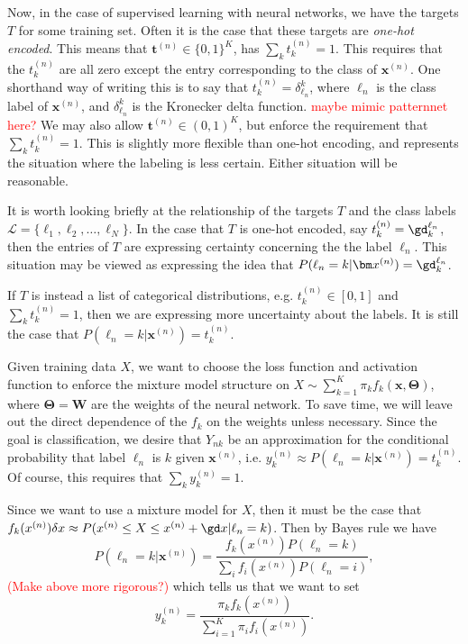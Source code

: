 Now, in the case of supervised learning with neural networks, we have the targets $T$ for
some training set.  Often it is the case that these targets are \textit{one-hot encoded}.
This means that $\bm t^{(n)}\in \{0,1\}^{K}$, has $\sum_k t_k^{(n)} = 1$.  This requires
that the $t_k^{(n)}$ are all zero except the entry corresponding to the class of $\bm
x^{(n)}$.  One shorthand way of writing this is to say that $t_k^{(n)}=\delta_{\ell_n}^k
$, where $\ell_n$ is the class label of $\bm x^{(n)}$, and $\delta_{\ell_n}^k$ is the 
Kronecker delta function. \textcolor{red}{maybe mimic patternnet here?}
We may also allow $\bm t^{(n)}\in (0,1)^{K}$, but enforce the requirement that $\sum_k
t_k^{(n)} = 1$.  This is slightly more flexible than one-hot encoding, and represents
the situation where the labeling is less certain.  Either situation will be reasonable.

It is worth looking briefly at the relationship of the targets $T$ and the class labels 
$\mathcal{L}=\{\ell_1, \ell_2,\ldots,\ell_N\}$.  In the case that $T$ is one-hot encoded,
say $t_k^{(n)}=\gd_k^{\ell_n}$, then the entries of $T$ are expressing certainty
concerning the the label $\ell_n$. This situation may be viewed as expressing the idea
that $P(\ell_n = k|\bm x^{(n)}) = \gd_k^{\ell_n}$. 

If $T$ is instead a list of categorical distributions, e.g. $t_k^{(n)}\in [0,1]$ and 
$\sum_k t_k^{(n)} = 1$, then we are expressing more uncertainty about the labels. It
is still the case that $P(\ell_n = k|\bm x^{(n)}) = t_k^{(n)}$.

Given training data $X$, we want to choose the loss function and activation function
to enforce the mixture model structure on 
$X \sim \sum_{k=1}^{K}\pi_kf_k(\bm x,\bm\Theta)$, where $\bm\Theta = \bm W$ are the
weights of the neural network. To save time, we will leave out the direct dependence of 
the $f_k$ on the weights unless necessary. Since the goal is classification, we desire
that $Y_{nk}$ be an approximation for the conditional probability that label $\ell_n$ is 
$k$ given $\bm x^{(n)}$, i.e. $y_k^{(n)}\approx P(\ell_n=k|\bm x^{(n)}) = t_k^{(n)}$. 
Of course, this requires that $\sum_{k}y_k^{(n)} = 1$.

Since we want to use a mixture model for $X$, then it must be the case that 
$f_k(x^{(n)})\delta x \approx P(x^{(n)}\leq X\leq x^{(n)}+\gd x|\ell_n=k)$. Then by Bayes
rule we have 
\[P(\ell_n=k|\bm x^{(n)}) = \frac{f_k(x^{(n)})P(\ell_n=k)}
{\sum_i f_i(x^{(n)})P(\ell_n=i)},\]
\textcolor{red}{(Make above more rigorous?)}
which tells us that we want to set 
\begin{equation}\label{Ydef}
y_k^{(n)}=\dfrac{\pi_k f_k(x^{(n)})}{\sum_{i=1}^{K}\pi_i f_i(x^{(n)})}.
\end{equation}


